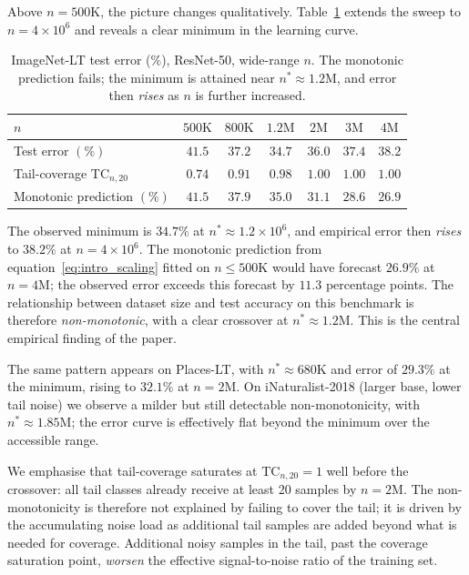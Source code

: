 \documentclass[11pt]{article}
\begin{document}
Above $n = 500\text{K}$, the picture changes qualitatively. Table~\ref{tab:crossover} extends the sweep to $n = 4 \times 10^6$ and reveals a clear minimum in the learning curve.

\begin{table}[h]
\centering
\caption{ImageNet-LT test error ($\%$), ResNet-50, wide-range $n$. The monotonic prediction fails; the minimum is attained near $n^{*} \approx 1.2\text{M}$, and error then \emph{rises} as $n$ is further increased.}
\label{tab:crossover}
\begin{tabular}{lcccccc}
\toprule
$n$ & $500\text{K}$ & $800\text{K}$ & $1.2\text{M}$ & $2\text{M}$ & $3\text{M}$ & $4\text{M}$ \\
\midrule
Test error $(\%)$ & $41.5$ & $37.2$ & $\mathbf{34.7}$ & $36.0$ & $37.4$ & $38.2$ \\
Tail-coverage $\mathrm{TC}_{n, 20}$ & $0.74$ & $0.91$ & $0.98$ & $1.00$ & $1.00$ & $1.00$ \\
Monotonic prediction $(\%)$ & $41.5$ & $37.9$ & $35.0$ & $31.1$ & $28.6$ & $26.9$ \\
\bottomrule
\end{tabular}
\end{table}

The observed minimum is $34.7\%$ at $n^{*} \approx 1.2 \times 10^{6}$, and empirical error then \emph{rises} to $38.2\%$ at $n = 4 \times 10^{6}$. The monotonic prediction from equation~\eqref{eq:intro_scaling} fitted on $n \le 500\text{K}$ would have forecast $26.9\%$ at $n = 4\text{M}$; the observed error exceeds this forecast by $11.3$ percentage points. The relationship between dataset size and test accuracy on this benchmark is therefore \emph{non-monotonic}, with a clear crossover at $n^{*} \approx 1.2\text{M}$. This is the central empirical finding of the paper.

The same pattern appears on Places-LT, with $n^{*} \approx 680\text{K}$ and error of $29.3\%$ at the minimum, rising to $32.1\%$ at $n = 2\text{M}$. On iNaturalist-2018 (larger base, lower tail noise) we observe a milder but still detectable non-monotonicity, with $n^{*} \approx 1.85\text{M}$; the error curve is effectively flat beyond the minimum over the accessible range.

We emphasise that tail-coverage saturates at $\mathrm{TC}_{n, 20} = 1$ well before the crossover: all tail classes already receive at least 20 samples by $n = 2\text{M}$. The non-monotonicity is therefore not explained by failing to cover the tail; it is driven by the accumulating noise load as additional tail samples are added beyond what is needed for coverage. Additional noisy samples in the tail, past the coverage saturation point, \emph{worsen} the effective signal-to-noise ratio of the training set.
\end{document}
